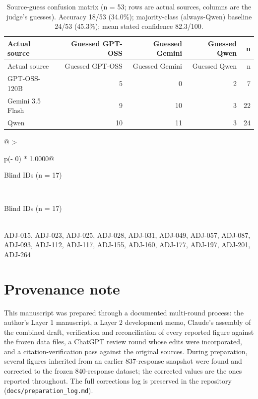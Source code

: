 \documentclass[11pt]{article}
\newcommand{\tableneed}[1]{\par\penalty0\ifdim\dimexpr\pagegoal-\pagetotal\relax<#1\relax\newpage\fi}
\providecommand{\real}[1]{#1}
\begin{document}
\tableneed{11\baselineskip}
{\small\setlength{\tabcolsep}{4pt}
\begin{longtable}[]{@{}lrrrr@{}}
\caption{Source-guess confusion matrix (n = 53; rows are actual sources, columns are the judge's guesses). Accuracy 18/53 (34.0\%); majority-class (always-Qwen) baseline 24/53 (45.3\%); mean stated confidence 82.3/100. \label{tbl-E4}}\tabularnewline
\toprule\noalign{}
Actual source & Guessed GPT-OSS & Guessed Gemini & Guessed Qwen & n \\
\midrule\noalign{}
\endfirsthead
\toprule\noalign{}
Actual source & Guessed GPT-OSS & Guessed Gemini & Guessed Qwen & n \\
\midrule\noalign{}
\endhead
\bottomrule\noalign{}
\endlastfoot
GPT-OSS-120B & 5 & 0 & 2 & 7 \\
Gemini 3.5 Flash & 9 & 10 & 3 & 22 \\
Qwen & 10 & 11 & 3 & 24 \\
\end{longtable}
}

\tableneed{12\baselineskip}
{\small\setlength{\tabcolsep}{4pt}
\begin{longtable}[]{@{}
  >{\raggedright\arraybackslash}p{(\columnwidth - 0\tabcolsep) * \real{1.0000}}@{}}
\caption{Rows the auditor flagged as rubric problems. \label{tbl-E5}}\tabularnewline
\toprule\noalign{}
\begin{minipage}[b]{\linewidth}\raggedright
Blind IDs (n = 17)
\end{minipage} \\
\midrule\noalign{}
\endfirsthead
\toprule\noalign{}
\begin{minipage}[b]{\linewidth}\raggedright
Blind IDs (n = 17)
\end{minipage} \\
\midrule\noalign{}
\endhead
\bottomrule\noalign{}
\endlastfoot
ADJ-015, ADJ-023, ADJ-025, ADJ-028, ADJ-031, ADJ-049, ADJ-057, ADJ-087, ADJ-093, ADJ-112, ADJ-117, ADJ-155, ADJ-160, ADJ-177, ADJ-197, ADJ-201, ADJ-264 \\
\end{longtable}
}


\hypertarget{app-F}{%
\section{Provenance note}\label{app-F}}

This manuscript was prepared through a documented multi-round process: the author's Layer 1 manuscript, a Layer 2 development memo, Claude's assembly of the combined draft, verification and reconciliation of every reported figure against the frozen data files, a ChatGPT review round whose edits were incorporated, and a citation-verification pass against the original sources. During preparation, several figures inherited from an earlier 837-response snapshot were found and corrected to the frozen 840-response dataset; the corrected values are the ones reported throughout. The full corrections log is preserved in the repository (\texttt{docs/\allowbreak{}preparation\_\allowbreak{}log.md}).
\end{document}
